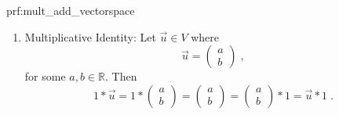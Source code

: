 \begin{prf}{prf:mult_add_vectorspace}
\begin{enumerate}
\item Multiplicative Identity: Let $\vec{u} \in V$ where $$ \vec{u} = \begin{pmatrix}
a \\
b
\end{pmatrix}\;,$$
for some $a,b \in \mathbb{R}.$ Then
$$1 * \vec{u} = 1 * \begin{pmatrix}
a \\
b
\end{pmatrix} = \begin{pmatrix}
a \\
b
\end{pmatrix} = \begin{pmatrix}
a \\
b
\end{pmatrix} * 1 = \vec{u} * 1\;.$$
\end{enumerate}
\end{prf}
